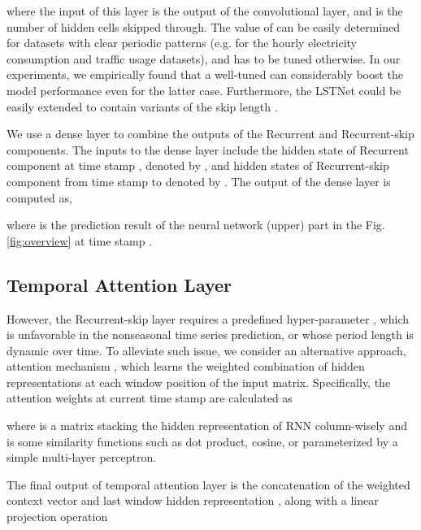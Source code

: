 \documentclass[sigconf]{acmart}
\begin{document}
where the input of this layer is the output of the convolutional layer, and  is the number of hidden cells skipped through. The value of  can be easily determined for datasets with clear periodic patterns (e.g.  for the hourly electricity consumption and traffic usage datasets), and has to be tuned otherwise. In our experiments, we empirically found that a well-tuned  can considerably boost the model performance even for the latter case. Furthermore, the LSTNet could be easily extended to contain variants of the skip length .

We use a dense layer to combine the outputs of the Recurrent and Recurrent-skip components. The inputs to the dense layer include the hidden state of Recurrent component at time stamp , denoted by , and  hidden states of Recurrent-skip component from time stamp  to  denoted by . The output of the dense layer is computed as,



where  is the prediction result of the neural network (upper) part in the Fig.\ref{fig:overview} at time stamp .

\subsection{Temporal Attention Layer}

However, the Recurrent-skip layer requires a predefined hyper-parameter ,
which is unfavorable in the nonseasonal time series prediction,
or whose period length is dynamic over time.
To alleviate such issue, 
we consider an alternative approach, attention mechanism \cite{bahdanau2014neural}, which learns the weighted combination of
hidden representations at each window position of the input matrix. Specifically, the attention weights  at current time stamp  are calculated as

where  is a matrix stacking the hidden representation
of RNN column-wisely and  is some similarity functions such as dot product, cosine,
or parameterized by a simple multi-layer perceptron.

The final output of temporal attention layer is the concatenation of the weighted context vector  and last window hidden representation , along with
a linear projection operation
\end{document}
